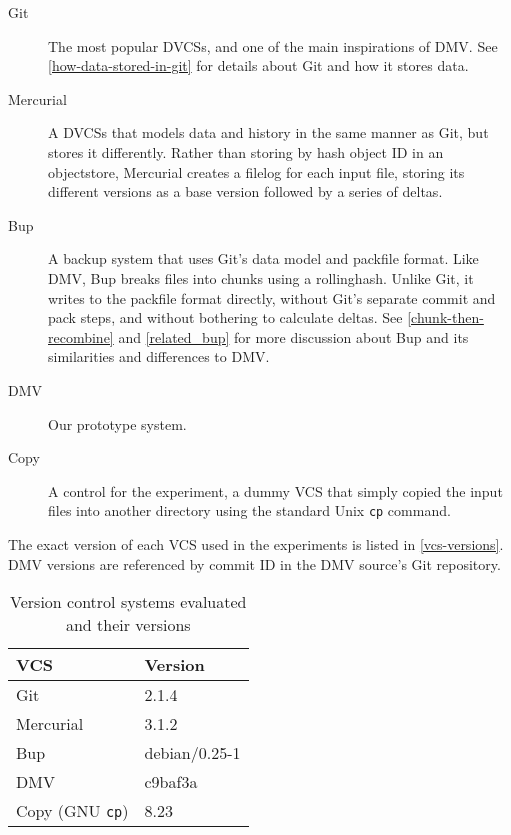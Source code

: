 \begin{description}

    \item[Git] The most popular \glspl{DVCS}, and one of the main inspirations
        of \gls{DMV}. See \autoref{how-data-stored-in-git} for details about Git
        and how it stores data.

    \item[Mercurial] A \glspl{DVCS} that models data and history in the same
        manner as Git, but stores it differently. Rather than storing by hash
        object ID in an \gls{objectstore}, Mercurial creates a \gls{filelog} for
        each input file, storing its different versions as a base version
        followed by a series of deltas\cite[Chapter 4]{hgbook}.

    \item[Bup] A backup system that uses Git's data model and \gls{packfile}
        format. Like DMV, Bup breaks files into chunks using a
        \gls{rollinghash}. Unlike Git, it writes to the \gls{packfile} format
        directly, without Git's separate commit and pack steps, and without
        bothering to calculate deltas\cite{bup_design}. See
        \autoref{chunk-then-recombine} and \autoref{related_bup} for more
        discussion about Bup and its similarities and differences to DMV.

    \item[DMV] Our prototype system.

    \item[Copy] A control for the experiment, a dummy \gls{VCS} that simply
        copied the input files into another directory using the standard Unix
        \lstinline{cp} command.

\end{description}

The exact version of each \gls{VCS} used in the experiments is listed in
\autoref{vcs-versions}. \gls{DMV} versions are referenced by commit ID in the
\gls{DMV} source's Git repository.

\begin{table}[bh]
    \caption{Version control systems evaluated and their versions}
    \label{vcs-versions}
    \centering
    \begin{tabular}{ l l }
        VCS & Version \\
        \midrule
        Git & 2.1.4 \\
        Mercurial & 3.1.2 \\
        Bup & debian/0.25-1 \\
        DMV & c9baf3a \\
        Copy (GNU \lstinline{cp}) & 8.23 \\
    \end{tabular}
\end{table}


